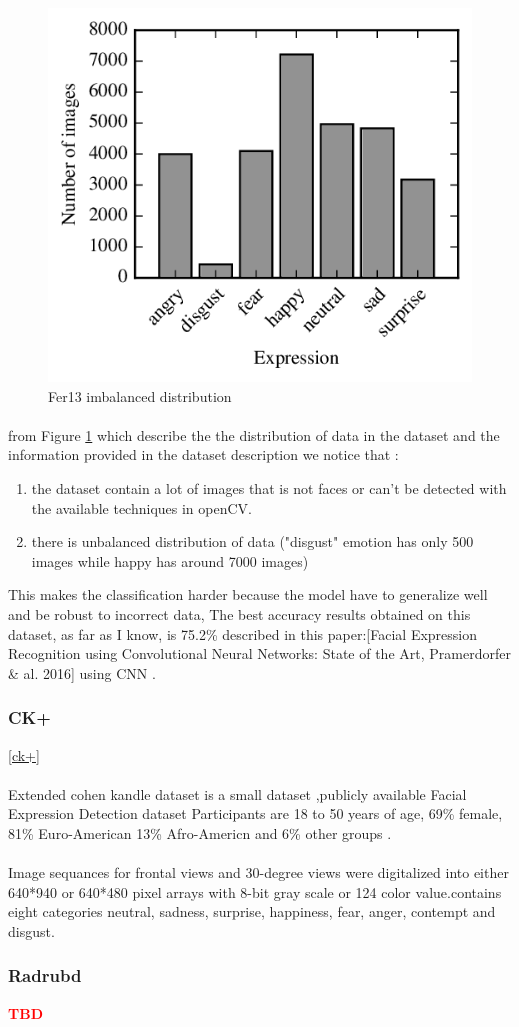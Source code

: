 \begin{figure}
	\centering
	\includegraphics[width=.5\textwidth]{images/fer_dis.png}
	\caption{Fer13 imbalanced distribution}
	\label{fig:fer13}
\end{figure} 
\paragraph{}
from Figure \ref{fig:fer13} which describe the the distribution of data in the dataset and the information provided in the dataset description we notice that :
\begin{enumerate}
	\item the dataset contain a lot of images that is not faces or can't be detected with the available techniques in openCV.
	\item there is unbalanced distribution of data ("disgust" emotion has only 500 images while happy has around 7000 images)   
\end{enumerate}

 This makes the classification harder because the model have to generalize well and be robust to incorrect data, The best accuracy results obtained on this dataset, as far as I know, is 75.2\% described in this paper:\cite{state_of_art}[Facial Expression Recognition using Convolutional Neural Networks: State of the Art, Pramerdorfer \& al. 2016] using CNN .

\subsubsection{CK+}
\ref{ck+}
\paragraph{}
Extended cohen kandle dataset is a small dataset ,publicly available Facial Expression Detection dataset Participants are 18 to 50 years of age, 69\% female, 81\% Euro-American 
13\% Afro-Americn and 6\% other groups .
\paragraph{}
Image sequances for frontal views and 30-degree views were digitalized into either 640*940 or 640*480 pixel arrays with 8-bit gray scale or 124 color value.contains eight categories neutral, sadness, surprise, happiness, fear, anger, contempt and disgust.	

\subsubsection{Radrubd}
\textcolor{red}{\textbf{TBD}}

